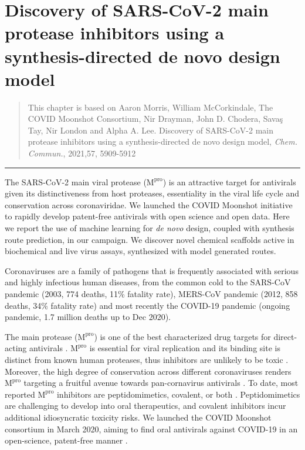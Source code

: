 \chapter{Discovery of SARS-CoV-2 main protease inhibitors using a synthesis-directed de novo design model}\label{ch:ranking}

\begin{quote}
    This chapter is based on Aaron Morris, William McCorkindale, The COVID Moonshot Consortium, Nir Drayman, John D. Chodera, Savaş Tay, Nir London and Alpha A. Lee. Discovery of SARS-CoV-2 main protease inhibitors using a synthesis-directed de novo design model, \textit{Chem. Commun.}, 2021,57, 5909-5912 
\end{quote}

\noindent\hfil\rule{0.5\textwidth}{.4pt}\hfil

The SARS-CoV-2 main viral protease ($\mathrm{M}^\mathrm{pro}$) is an attractive target for antivirals given its distinctiveness from host proteases, essentiality in the viral life cycle and conservation across coronaviridae. We launched the COVID Moonshot initiative to rapidly develop patent-free antivirals with open science and open data. Here we report the use of machine learning for \emph{de novo} design, coupled with synthesis route prediction, in our campaign. We discover novel chemical scaffolds active in biochemical and live virus assays, synthesized with model generated routes.

Coronaviruses are a family of pathogens that is frequently associated with serious and highly infectious human diseases, from the common cold to the SARS-CoV pandemic (2003, 774 deaths, 11\% fatality rate), MERS-CoV pandemic (2012, 858 deaths, 34\% fatality rate) and most recently the COVID-19 pandemic (ongoing pandemic, 1.7 million deaths up to Dec 2020).

The main protease ($\mathrm{M}^\mathrm{pro}$) is one of the best characterized drug targets for direct-acting antivirals \cite{pillaiyar2016overview,cannalire2020targeting}. $\mathrm{M}^\mathrm{pro}$ is essential for viral replication and its binding site is distinct from known human proteases, thus inhibitors are unlikely to be toxic \cite{jin2020structure,liu2020development}. Moreover, the high degree of conservation across different coronaviruses renders $\mathrm{M}^\mathrm{pro}$ targeting a fruitful avenue towards pan-cornavirus antivirals \cite{ullrich2020sars}. To date, most reported $\mathrm{M}^\mathrm{pro}$ inhibitors are peptidomimetics, covalent, or both \cite{cannalire2020targeting}. Peptidomimetics are challenging to develop into oral therapeutics, and covalent inhibitors incur additional idiosyncratic toxicity risks. We launched the COVID Moonshot consortium in March 2020, aiming to find oral antivirals against COVID-19 in an open-science, patent-free manner \cite{chodera2020crowdsourcing}. 

